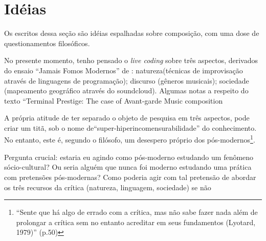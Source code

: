 \section{Idéias}

Os escritos dessa seção são idéias espalhadas sobre composição, com uma dose de questionamentos filosóficos.

No presente momento, tenho pensado o \emph{live coding} sobre três aspectos, derivados do ensaio ``Jamais Fomos Modernos'' de : natureza(técnicas de improvisação através de linguagens de programação); discurso (gêneros musicais); sociedade (mapeamento geográfico através do soundcloud). Algumas notas a respeito do texto ``Terminal Prestige: The case of Avant-garde Music composition 

A própria atitude de ter separado o objeto de pesquisa em três aspectos, pode criar um titã, sob o nome de``super-hiperincomensurabilidade'' do conhecimento. No entanto, este é, segundo o filósofo, um desespero próprio dos pós-modernos\footnote{``Sente que há algo de errado com a crítica, mas não sabe fazer nada além de prolongar a crítica sem no entanto acreditar em seus fundamentos (Lyotard, 1979)'' (p.50)}.

Pergunta crucial: estaria eu agindo como pós-moderno estudando um fenômeno sócio-cultural? Ou seria alguém que nunca foi moderno estudando uma prática com pretensões pós-modernas? Como poderia agir com tal pretensão de abordar os três recursos da crítica (natureza, linguagem, sociedade) se não 